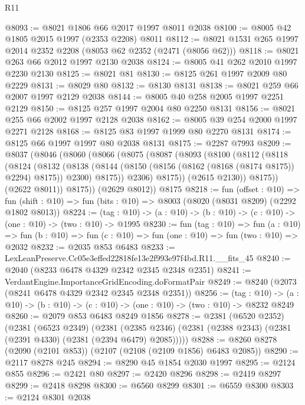 \begin{lexlean}{R11}
\begin{coremodule}
@8093 := @8021 @1806 @66 @2017 @1997 @8011 @2038
@8100 := @8005 @42 @1805 @2015 @1997 (@2353 @2208) @8011
@8112 := @8021 @1531 @265 @1997 @2014 @2352 @2208 (@8053 @62 @2352 (@2471 (@8056 @62)))
@8118 := @8021 @263 @66 @2012 @1997 @2130 @2038
@8124 := @8005 @41 @262 @2010 @1997 @2230 @2130
@8125 := @8021 @81
@8130 := @8125 @261 @1997 @2009 @80 @2229
@8131 := @8029 @80
@8132 := @8130 @8131
@8138 := @8021 @259 @66 @2007 @1997 @2129 @2038
@8144 := @8005 @40 @258 @2005 @1997 @2251 @2129
@8150 := @8125 @257 @1997 @2004 @80 @2250 @8131
@8156 := @8021 @255 @66 @2002 @1997 @2128 @2038
@8162 := @8005 @39 @254 @2000 @1997 @2271 @2128
@8168 := @8125 @83 @1997 @1999 @80 @2270 @8131
@8174 := @8125 @66 @1997 @1997 @80 @2038 @8131
@8175 := @2287 @7993
@8209 := @8037
    (@8046
      (@8060
        (@8066
          (@8075
            (@8087
              (@8093
                (@8100
                  (@8112
                    (@8118
                      (@8124
                        (@8132
                          (@8138
                            (@8144 (@8150 (@8156 (@8162 (@8168 (@8174 @8175)) @2294) @8175)) @2300)
                            @8175))
                        @2306)
                      @8175))
                  (@2615 @2130))
                @8175))
            (@2622 @8011))
          @8175))
      (@2629 @8012))
    @8175
@8218 := fun (offset : @10) =>
  fun (shift : @10) => fun (bits : @10) => @8003 (@8020 (@8031 @8209) (@2292 @1802 @8013))
@8224 := (tag : @10) -> (a : @10) -> (b : @10) -> (c : @10) -> (one : @10) -> (two : @10) -> @1995
@8230 := fun (tag : @10) =>
  fun (a : @10) => fun (b : @10) => fun (c : @10) => fun (one : @10) => fun (two : @10) => @2032
@8232 := @2035 @853 @6483
@8233 := LexLeanPreserve.Cc05e3effed22818fe13e2f993e97f4bd.R11.__fits_45
@8240 := @2040 (@8233 @6478 @4329 @2342 @2345 @2348 @2351)
@8241 := VerdantEngine.ImportanceGridEncoding.doFormatPair
@8249 := @8240 (@2073 (@8241 @6478 @4329 @2342 @2345 @2348 @2351))
@8256 := (tag : @10) ->
  (a : @10) -> (b : @10) -> (c : @10) -> (one : @10) -> (two : @10) -> @8232 @8249
@8260 := @2079 @853 @6483 @8249 @1856
@8278 := @2381
    (@6520 @2352)
    (@2381
      (@6523 @2349)
      (@2381 (@2385 @2346) (@2381 (@2388 @2343) (@2381 (@2391 @4330) (@2381 (@2394 @6479) @2085)))))
@8288 := @8260 @8278 (@2090 (@2101 @853)) (@2107 (@2108 (@2109 @1856) @6483 @2085))
@8290 := @2117 @8278 @245
@8294 := @8290 @45 @1854 @2030 @1997
@8295 := @2124 @855
@8296 := @2421 @80
@8297 := @2420 @8296
@8298 := @2419 @8297
@8299 := @2418 @8298
@8300 := @6560 @8299
@8301 := @6559 @8300
@8303 := @2124 @8301 @2038

\end{coremodule}
\end{lexlean}
